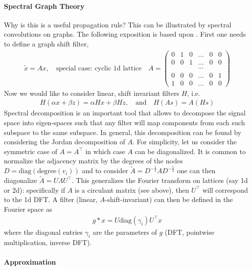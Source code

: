 \documentclass[12pt,a4paper]{article}
\begin{document}
\paragraph*{Spectral Graph Theory} 
Why is this is a useful propagation rule? This can be illustrated by spectral convolutions on graphs. The following exposition is based upon \cite{sandryhaila2013discrete}. First one needs to define a graph shift filter,
\begin{align}
\tilde x = A x,\quad \text{special case: cyclic 1d lattice} \quad A = \begin{pmatrix}
0 & 1 & 0 & \dots & 0 & 0 \\
0 & 0 & 1 & \dots & 0 & 0 \\
& & & \cdots & \\
0 & 0 & 0 & \dots & 0 & 1\\
1 & 0 & 0 & \dots & 0 & 0
\end{pmatrix}
\end{align}
Now we would like to consider linear, shift invariant filters $H$, i.e.
\begin{align}
H(\alpha x + \beta z)  = \alpha Hx + \beta Hz, \quad \text{and} \quad H(As) = A(Hs)
\end{align}
Spectral decomposition is an important tool that allows to decompose the signal space into eigen-spaces such that any filter will map components from each such subspace to the same subspace. In general, this decomposition can be found by considering the Jordan decomposition of $A$. For simplicity, let us consider the symmetric case of $A = A^\top$ in which case $A$ can be diagonalized. It is common to normalize the adjacency matrix by the degrees of the nodes $D = \text{diag}(\text{degree}(v_i))$ and to consider $\tilde A = D^{-\frac12} A D^{-\frac 12}$ one can then diagonalize $\tilde A = U \Lambda U^\top$. This generalizes the Fourier transform on lattices (say 1d or 2d): specifically if $A$ is a circulant matrix (see above), then $U^\top$ will correspond to the 1d DFT. A filter (linear, $A$-shift-invariant) can then be defined in the Fourier space as
\begin{align}
g \ast x = U \text{diag}(\gamma_i)  U^\top x
\end{align}
where the diagonal entries $\gamma_i$ are the parameters of $g$ (DFT, pointwise multiplication, inverse DFT). 

\paragraph{Approximation}
\end{document}
